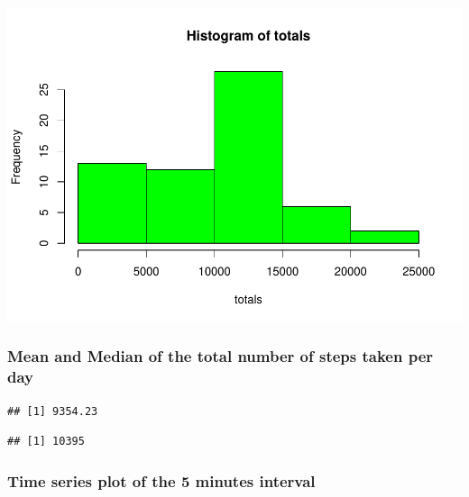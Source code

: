 \documentclass[]{article}
\newenvironment{Shaded}{\begin{snugshade}}{\end{snugshade}}
\newcommand{\KeywordTok}[1]{\textcolor[rgb]{0.13,0.29,0.53}{\textbf{#1}}}
\newcommand{\OperatorTok}[1]{\textcolor[rgb]{0.81,0.36,0.00}{\textbf{#1}}}
\newcommand{\NormalTok}[1]{#1}
\begin{document}
\includegraphics{PA1_template_files/figure-latex/unnamed-chunk-5-1.pdf}

\subsubsection{Mean and Median of the total number of steps taken per
day}\label{mean-and-median-of-the-total-number-of-steps-taken-per-day}

\begin{Shaded}
\end{Shaded}

\begin{verbatim}
## [1] 9354.23
\end{verbatim}

\begin{Shaded}
\end{Shaded}

\begin{verbatim}
## [1] 10395
\end{verbatim}

\subsubsection{Time series plot of the 5 minutes
interval}\label{time-series-plot-of-the-5-minutes-interval}
\end{document}
